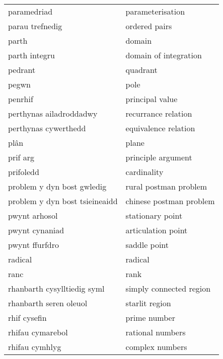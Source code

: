 \begin{supertabular}{p{0.22\textwidth}p{0.22\textwidth}}
                     paramedriad &                  parameterisation \\
                 parau trefnedig &                     ordered pairs \\
                           parth &                            domain \\
                   parth integru &             domain of integration \\
                         pedrant &                          quadrant \\
                           pegwn &                              pole \\
                         penrhif &                   principal value \\
         perthynas ailadroddadwy &               recurrance relation \\
            perthynas cywerthedd &              equivalence relation \\
                            plân &                             plane \\
                        prif arg &                principle argument \\
                       prifoledd &                       cardinality \\
      problem y dyn bost gwledig &             rural postman problem \\
  problem y dyn bost tsieineaidd &           chinese postman problem \\
                   pwynt arhosol &                  stationary point \\
                  pwynt cynaniad &                articulation point \\
                  pwynt ffurfdro &                      saddle point \\
                         radical &                           radical \\
                            ranc &                              rank \\
     rhanbarth cysylltiedig syml &           simply connected region \\
          rhanbarth seren oleuol &                    starlit region \\
                    rhif cysefin &                      prime number \\
                rhifau cymarebol &                  rational numbers \\
                  rhifau cymhlyg &                   complex numbers \\

\end{supertabular}
